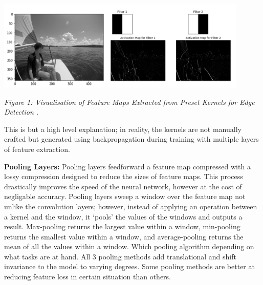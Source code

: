 \documentclass[11pt]{article}
\def\paraskip{\vskip 0.4cm}
\begin{document}
        \begin{center}
            \includegraphics[width=12cm]{kernels.png}
            \\
            \raggedright \textit{
            Figure 1: Visualisation of Feature Maps Extracted from Preset Kernels for Edge Detection \cite{cnn goat}.
            }
        \end{center}
        
        \noindent This is but a high level explanation; in reality, the kernels are not manually crafted but generated using backpropagation during training with multiple layers of feature extraction.

        \paraskip
        \noindent\textbf{Pooling Layers: } Pooling layers feedforward a feature map compressed with a lossy compression designed to reduce the sizes of feature maps. This process drastically improves the speed of the neural network, however at the cost of negligable accuracy. Pooling layers sweep a window over the feature map not unlike the convolution layers; however, instead of applying an operation between a kernel and the window, it `pools' the values of the windows and outputs a result. Max-pooling returns the largest value within a window, min-pooling returns the smallest value within a window, and average-pooling returns the mean of all the values within a window. Which pooling algorithm depending on what tasks are at hand. All 3 pooling methods add translational and shift invariance to the model to varying degrees. Some pooling methods are better at reducing feature loss in certain situation than others.
\end{document}
